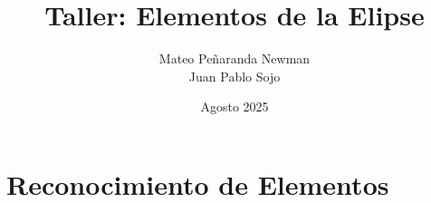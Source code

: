 \documentclass{article}
\begin{document}
\title{Taller: Elementos de la Elipse}
\author{Mateo Peñaranda Newman \\ Juan Pablo Sojo}
\date{Agosto 2025}
\maketitle

\section{Reconocimiento de Elementos}
\end{document}

